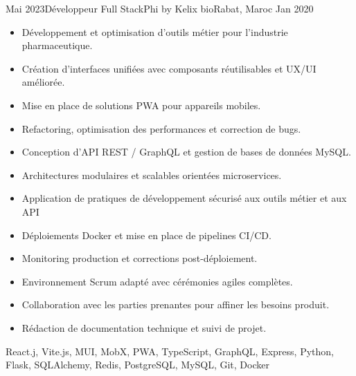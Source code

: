 \begin{experiences}
    \experience
        {Mai 2023}{Développeur Full Stack}{Phi by Kelix bio}{Rabat, Maroc}
        {Jan 2020}
            {\begin{itemize}
                \item Développement et optimisation d'outils métier pour l'industrie pharmaceutique.
                \item Création d'interfaces unifiées avec composants réutilisables et UX/UI améliorée.
                \item Mise en place de solutions PWA pour appareils mobiles.
                \item Refactoring, optimisation des performances et correction de bugs.
                \item Conception d'API REST / GraphQL et gestion de bases de données MySQL.
                \item Architectures modulaires et scalables orientées microservices.
                \item Application de pratiques de développement sécurisé aux outils métier et aux API
                \item Déploiements Docker et mise en place de pipelines CI/CD.
                \item Monitoring production et corrections post-déploiement.
                \item Environnement Scrum adapté avec cérémonies agiles complètes.
                \item Collaboration avec les parties prenantes pour affiner les besoins produit.
                \item Rédaction de documentation technique et suivi de projet.
            \end{itemize}}
            {React.j, Vite.js, MUI, MobX, PWA, TypeScript, GraphQL, Express, Python, Flask, SQLAlchemy, Redis, PostgreSQL, MySQL, Git, Docker}
    \emptySeparator
\end{experiences}
